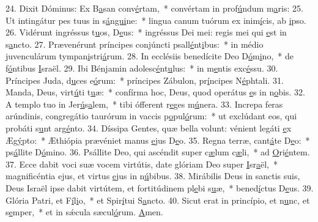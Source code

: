 24. Dixit Dóminus: Ex B\uline{a}san conv\uline{é}rtam,~* convértam in prof\uline{ú}ndum m\uline{a}ris:
25. Ut intingátur pes tuus in s\uline{á}n\uline{gui}ne:~* lingua canum tuórum ex inim\uline{í}cis, ab \uline{i}pso.
26. Vidérunt ingréssus t\uline{u}os, D\uline{e}us:~* ingréssus Dei mei: regis mei qui \uline{e}st in s\uline{a}ncto.
27. Prævenérunt príncipes conjúncti psall\uline{é}nt\uline{i}bus:~* in médio juvenculárum tympan\uline{i}stri\uline{á}rum.
28. In ecclésiis benedícite Deo D\uline{ó}m\uline{i}no,~* de f\uline{ó}ntibus \uline{I}sraël.
29. Ibi Bénjamin adolesc\uline{é}nt\uline{u}lus:~* in m\uline{e}ntis exc\uline{é}ssu.
30. Príncipes Juda, d\uline{u}ces e\uline{ó}rum:~* príncipes Zábulon, pr\uline{í}ncipes N\uline{é}phtali.
31. Manda, Deus, virt\uline{ú}ti t\uline{u}æ:~* confírma hoc, Deus, quod operátus \uline{e}s in n\uline{o}bis.
32. A templo tuo in Jer\uline{ú}s\uline{a}lem,~* tibi ófferent r\uline{e}ges m\uline{ú}nera.
33. Increpa feras arúndinis, congregátio taurórum in vaccis p\uline{o}pul\uline{ó}rum:~* ut exclúdant eos, qui probáti s\uline{u}nt arg\uline{é}nto.
34. Díssipa Gentes, quæ bella volunt: vénient legáti \uline{e}x Æg\uline{ý}pto:~* Æthiópia prævéniet manus \uline{e}jus D\uline{e}o.
35. Regna terræ, cant\uline{á}te D\uline{e}o:~* ps\uline{á}llite D\uline{ó}mino.
36. Psállite Deo, qui ascéndit super c\uline{æ}lum c\uline{æ}li,~* ad \uline{O}ri\uline{é}ntem.
37. Ecce dabit voci suæ vocem virtútis, date glóriam Deo super \uline{I}sr\uline{a}ël,~* magnificéntia ejus, et virtus \uline{e}jus in n\uline{ú}bibus.
38. Mirábilis Deus in sanctis suis, Deus Israël ipse dabit virtútem, et fortitúdinem pl\uline{e}bi s\uline{u}æ,~* bened\uline{í}ctus D\uline{e}us.
39. Glória Patri, et F\uline{í}l\uline{i}o,~* et Spir\uline{í}tui S\uline{a}ncto.
40. Sicut erat in princípio, et n\uline{u}nc, et s\uline{e}mper,~* et in sǽcula sæcul\uline{ó}rum. \uline{A}men.
